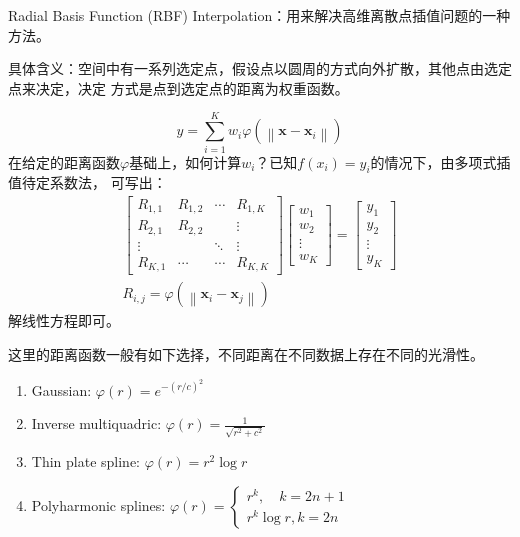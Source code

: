 \documentclass[lang=cn,newtx,10pt,scheme=chinese]{elegantbook}
\begin{document}
Radial Basis Function (RBF) Interpolation：用来解决高维离散点插值问题的一种方法。

具体含义：空间中有一系列选定点，假设点以圆周的方式向外扩散，其他点由选定点来决定，决定
方式是点到选定点的距离为权重函数。

\begin{equation}
  y=\sum_{i=1}^K w_i \varphi\left(\left\|\boldsymbol{x} -\boldsymbol{x}_i\right\|\right)
\end{equation}
在给定的距离函数$\varphi$基础上，如何计算$w_i$？已知$f(x_i)=y_i$的情况下，由多项式插值待定系数法，
可写出：
\begin{equation}
  \begin{gathered}
  {\left[\begin{array}{cccc}
  R_{1,1} & R_{1,2} & \cdots & R_{1, K} \\
  R_{2,1} & R_{2,2} & & \vdots \\
  \vdots & & \ddots & \vdots \\
  R_{K, 1} & \cdots & \cdots & R_{K, K}
  \end{array}\right]\left[\begin{array}{c}
  w_1 \\
  w_2 \\
  \vdots \\
  w_K
  \end{array}\right]=\left[\begin{array}{c}
  y_1 \\
  y_2 \\
  \vdots \\
  y_K
  \end{array}\right]} \\
  R_{i, j}=\varphi\left(\left\|\boldsymbol{x}_i-\boldsymbol{x}_j\right\|\right)
  \end{gathered}
\end{equation}
解线性方程即可。

这里的距离函数一般有如下选择，不同距离在不同数据上存在不同的光滑性。
\begin{enumerate}
  \setlength{\itemindent}{2em}
  \item Gaussian: $\varphi(r)=e^{-(r / c)^2}$
  \item Inverse multiquadric: $\varphi(r)=\frac{1}{\sqrt{r^2+c^2}}$
  \item Thin plate spline: $\varphi(r)=r^2 \log r$
  \item Polyharmonic splines: $\varphi(r)=\left\{\begin{array}{l}r^k, \quad k=2 n+1 \\ r^k \log r, k=2 n\end{array}\right.$ 
\end{enumerate}
\end{document}
